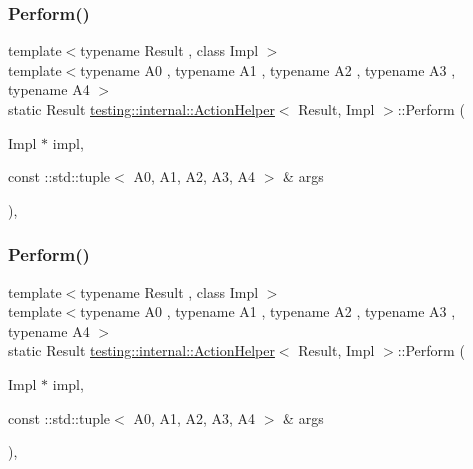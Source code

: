 \mbox{\label{classtesting_1_1internal_1_1_action_helper_a79d7d411d9d2149076d8ab672757c9e9}} 
\subsubsection{\texorpdfstring{Perform()}{Perform()}\hspace{0.1cm}{\footnotesize\ttfamily [11/33]}}
{\footnotesize\ttfamily template$<$typename Result , class Impl $>$ \\
template$<$typename A0 , typename A1 , typename A2 , typename A3 , typename A4 $>$ \\
static Result \mbox{\hyperlink{classtesting_1_1internal_1_1_action_helper}{testing\+::internal\+::\+Action\+Helper}}$<$ Result, Impl $>$\+::Perform (\begin{DoxyParamCaption}\item[{Impl $\ast$}]{impl,  }\item[{const \+::std\+::tuple$<$ A0, A1, A2, A3, A4 $>$ \&}]{args }\end{DoxyParamCaption})\hspace{0.3cm}{\ttfamily [inline]}, {\ttfamily [static]}}

\mbox{\label{classtesting_1_1internal_1_1_action_helper_a79d7d411d9d2149076d8ab672757c9e9}} 
\subsubsection{\texorpdfstring{Perform()}{Perform()}\hspace{0.1cm}{\footnotesize\ttfamily [12/33]}}
{\footnotesize\ttfamily template$<$typename Result , class Impl $>$ \\
template$<$typename A0 , typename A1 , typename A2 , typename A3 , typename A4 $>$ \\
static Result \mbox{\hyperlink{classtesting_1_1internal_1_1_action_helper}{testing\+::internal\+::\+Action\+Helper}}$<$ Result, Impl $>$\+::Perform (\begin{DoxyParamCaption}\item[{Impl $\ast$}]{impl,  }\item[{const \+::std\+::tuple$<$ A0, A1, A2, A3, A4 $>$ \&}]{args }\end{DoxyParamCaption})\hspace{0.3cm}{\ttfamily [inline]}, {\ttfamily [static]}}

